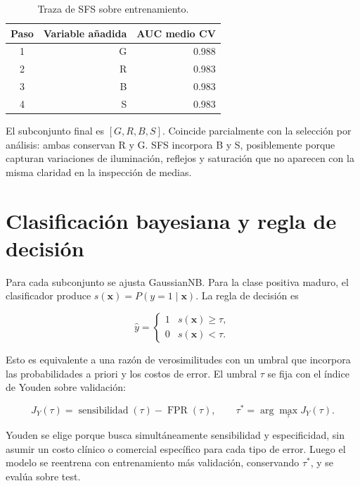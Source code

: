 \documentclass[11pt,a4paper]{article}
\begin{document}
\begin{table}[H]
\centering
\caption{Traza de SFS sobre entrenamiento.}
\begin{tabular}{crr}
\toprule
Paso & Variable añadida & AUC medio CV \\
\midrule
1 & G & 0.988 \\
2 & R & 0.983 \\
3 & B & 0.983 \\
4 & S & 0.983 \\
\bottomrule
\end{tabular}
\end{table}

El subconjunto final es $[G,R,B,S]$. Coincide parcialmente con la selección por
análisis: ambas conservan R y G. SFS incorpora B y S, posiblemente porque capturan
variaciones de iluminación, reflejos y saturación que no aparecen con la misma
claridad en la inspección de medias.

\section{Clasificación bayesiana y regla de decisión}

Para cada subconjunto se ajusta GaussianNB. Para la clase positiva maduro, el
clasificador produce $s(\mathbf{x})=P(y=1\mid\mathbf{x})$. La regla de decisión es

\begin{equation}
\hat y=\begin{cases}
1 & s(\mathbf{x})\geq \tau,\\
0 & s(\mathbf{x})<\tau.
\end{cases}
\end{equation}

Esto es equivalente a una razón de verosimilitudes con un umbral que incorpora las
probabilidades a priori y los costos de error. El umbral $\tau$ se fija con el
índice de Youden sobre validación:

\begin{equation}
J_{Y}(\tau)=\operatorname{sensibilidad}(\tau)-\operatorname{FPR}(\tau),
\qquad \tau^*=\arg\max_{\tau}J_Y(\tau).
\end{equation}

Youden se elige porque busca simultáneamente sensibilidad y especificidad, sin
asumir un costo clínico o comercial específico para cada tipo de error. Luego el
modelo se reentrena con entrenamiento más validación, conservando $\tau^*$, y se
evalúa sobre test.
\end{document}
